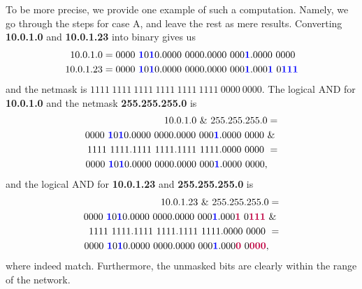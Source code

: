 \documentclass[10pt]{article}
\begin{document}
To be more precise, we provide one example of such a computation. Namely, we go through the steps for case A, and leave the rest as mere results. Converting \textbf{10.0.1.0} and \textbf{10.0.1.23} into binary gives us
\begin{align*}
  10.0.1.0 &= 0000\ {\color{blue}\textbf{1}}0{\color{blue}\textbf{1}}0.0000\ 0000.0000\ 000{\color{blue}\textbf{1}}.0000\ 0000 \\
  10.0.1.23 &= 0000\ {\color{blue}\textbf{1}}0{\color{blue}\textbf{1}}0.0000\ 0000.0000\ 000{\color{blue}\textbf{1}}.000{\color{blue}\textbf{1}}\ 0{\color{blue}\textbf{111}}
\end{align*}
and the netmask is $1111\ 1111\ 1111\ 1111\ 1111\ 1111\ 0000\ 0000$. The logical AND for \textbf{10.0.1.0} and the netmask \textbf{255.255.255.0} is
\begin{align*}
  10.0.1.0\ \&\ 255.255.255.0 &= \\
  0000\ {\color{blue}\textbf{1}}0{\color{blue}\textbf{1}}0.0000\ 0000.0000\ 000{\color{blue}\textbf{1}}.0000\ 0000\ &\& \\
  1111\ 1111.1111\ 1111.1111\ 1111.0000\ 0000\ &= \\
  0000\ {\color{blue}\textbf{1}}0{\color{blue}\textbf{1}}0.0000\ 0000.0000\ 000{\color{blue}\textbf{1}}.0000\ 0000,
\end{align*}
and the logical AND for \textbf{10.0.1.23} and \textbf{255.255.255.0} is
\begin{align*}
  10.0.1.23\ \&\ 255.255.255.0 &= \\
  0000\ {\color{blue}\textbf{1}}0{\color{blue}\textbf{1}}0.0000\ 0000.0000\ 000{\color{blue}\textbf{1}}.000{\color{purple}\textbf{1}}\ 0{\color{purple}\textbf{111}}\ &\& \\
  1111\ 1111.1111\ 1111.1111\ 1111.0000\ 0000\ &= \\
  0000\ {\color{blue}\textbf{1}}0{\color{blue}\textbf{1}}0.0000\ 0000.0000\ 000{\color{blue}\textbf{1}}.000{\color{purple}\textbf{0}}\ 0{\color{purple}\textbf{000}},
\end{align*} 
where indeed match. Furthermore, the unmasked bits are clearly within the range of the network.
\end{document}
